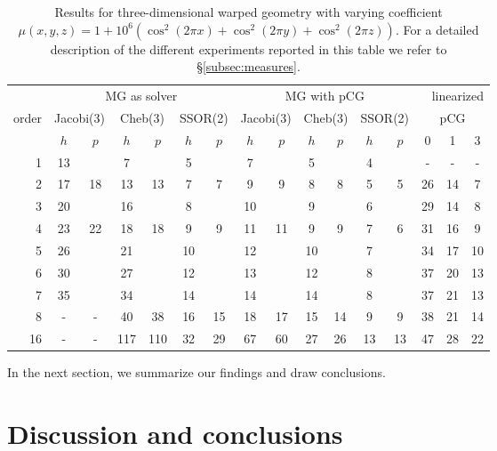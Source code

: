 \documentclass[smallcondensed,final]{svjour3}     %
\begin{document}
\begin{table}
  \caption{\label{tab:3d-fan} Results for three-dimensional warped
    geometry with varying coefficient $\mu(x,y,z) = 1 +
    10^6(\cos^2(2\pi x) + \cos^2(2\pi y) + \cos^2(2\pi z))$. For a
    detailed description of the different experiments reported in this
    table we refer to \S\ref{subsec:measures}.}  \centering
	  \begin{tabular}{|r|c c|c c|c c||c c|c c|c c||c c c|} 
	    \hline
	    & \multicolumn{6}{c||}{MG as solver} & \multicolumn{6}{c||}{MG with pCG} & \multicolumn{3}{r|}{linearized} \\
	    \cline{2-13}
	    \!\!\! order \!\!\!\! &  \multicolumn{2}{c|}{\!\scriptsize  Jacobi(3)\!} &  \multicolumn{2}{c|}{\!\scriptsize Cheb(3)\!} & \multicolumn{2}{c||}{\!\scriptsize  SSOR(2)\!} & \multicolumn{2}{c|}{\!\scriptsize Jacobi(3)\!} &  \multicolumn{2}{c|}{\!\scriptsize Cheb(3)\!} & \multicolumn{2}{c||}{\!\scriptsize SSOR(2)\!} & \multicolumn{3}{c|}{pCG}\\
	\hline
	 & $h$ & $p$ & $h$ & $p$& $h$ & $p$& $h$ & $p$& $h$ & $p$& $h$ & $p$& 0 & 1 & 3\\
	 \cline{2-16}
1 & 13 & & 7 & & 5 & & 7 & & 5 & & 4 & & - & - & - \\
2 & 17 & 18 & 13 & 13 & 7 & 7 & 9 & 9 & 8 & 8 & 5 & 5 & 26 & 14 & 7 \\
3 & 20 & & 16 & & 8 & & 10 & & 9 & & 6 & & 29 & 14 & 8 \\
4 & 23 & 22 & 18 & 18 & 9 & 9 & 11 & 11 & 9 & 9 & 7 & 6 & 31 & 16 & 9\\
5 & 26 & & 21 & & 10 & & 12 & & 10 & & 7 & & 34 & 17 & 10  \\
6 & 30 & & 27 & & 12 & & 13 & & 12 & & 8 & & 37 & 20 & 13 \\
7 & 35 & & 34 & & 14 & & 14 & & 14 & & 8 & & 37 & 21 & 13  \\
8 & - & - & 40 & 38 & 16 & 15 & 18 & 17 & 15 & 14 & 9 & 9 & 38 & 21 & 14 \\
16 & - & - & 117 & 110 & 32 & 29 & 67 & 60 & 27 & 26 & 13 & 13 & 47 & 28 & 22 \\
\hline
  \end{tabular}
\end{table}

In the next section, we summarize our findings and draw conclusions.

\section{Discussion and conclusions}
\label{sec:discuss}
\end{document}
